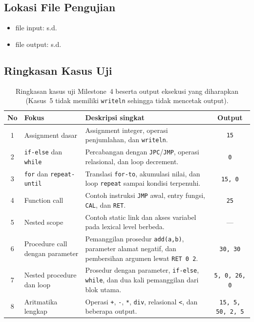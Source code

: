 \documentclass[11pt,a4paper]{article}
\begin{document}
\subsection{Lokasi File Pengujian}

\begin{itemize}
    \item file input:  s.d. 
    \item file output:  s.d. 
\end{itemize}

\subsection{Ringkasan Kasus Uji}

\begin{table}[H]
\centering
\footnotesize
\begin{tabularx}{\textwidth}{c l X c}
\toprule
\textbf{No} & \textbf{Fokus} & \textbf{Deskripsi singkat} & \textbf{Output} \\
\midrule
1 & Assignment dasar & Assignment integer, operasi penjumlahan, dan \texttt{writeln}. & \texttt{15} \\
2 & \texttt{if-else} dan \texttt{while} & Percabangan dengan \texttt{JPC}/\texttt{JMP}, operasi relasional, dan loop decrement. & \texttt{0} \\
3 & \texttt{for} dan \texttt{repeat-until} & Translasi \texttt{for-to}, akumulasi nilai, dan loop \texttt{repeat} sampai kondisi terpenuhi. & \texttt{15, 0} \\
4 & Function call & Contoh instruksi \texttt{JMP} awal, entry fungsi, \texttt{CAL}, dan \texttt{RET}. & \texttt{25} \\
5 & Nested scope & Contoh static link dan akses variabel pada lexical level berbeda. & --- \\
6 & Procedure call dengan parameter & Pemanggilan prosedur \texttt{add(a,b)}, parameter alamat negatif, dan pembersihan argumen lewat \texttt{RET 0 2}. & \texttt{30, 30} \\
7 & Nested procedure dan loop & Prosedur dengan parameter, \texttt{if-else}, \texttt{while}, dan dua kali pemanggilan dari blok utama. & \texttt{5, 0, 26, 0} \\
8 & Aritmatika lengkap & Operasi \texttt{+}, \texttt{-}, \texttt{*}, \texttt{div}, relasional \texttt{<}, dan beberapa output. & \texttt{15, 5, 50, 2, 5} \\
\bottomrule
\end{tabularx}
\caption{Ringkasan kasus uji Milestone~4 beserta output eksekusi yang diharapkan
(Kasus~5 tidak memiliki \texttt{writeln} sehingga tidak mencetak output).}
\label{tab:tests}
\end{table}
\end{document}

